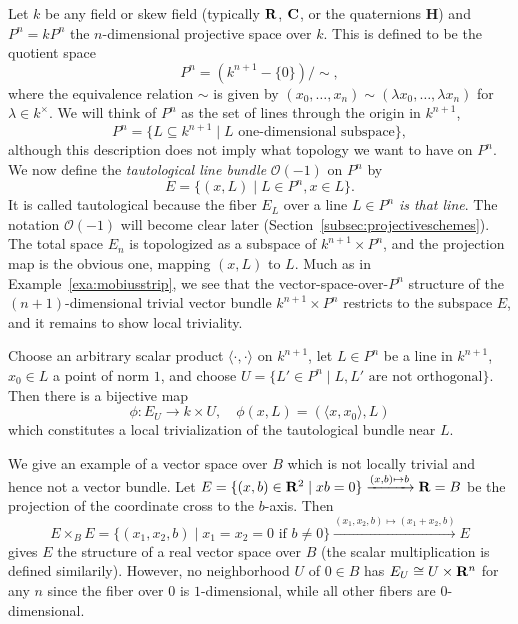 \documentclass[a4paper,openany]{scrbook}
\begin{document}
\begin{example} \label{exa:tautological-bundles}
Let $k$ be any field or skew field (typically $\mathbf R$, $\mathbf C$, or the quaternions $\mathbf H$) and $P^n = kP^n$ the $n$-dimensional projective space over $k$. This is defined to be the quotient space
\[
P^n = \left(k^{n+1}-\{0\}\right)/\sim,
\]
where the equivalence relation $\sim$ is given by $(x_0,\dots,x_n) \sim (\lambda x_0,\dots,\lambda x_n)$ for $\lambda \in k^\times$. We will think of $P^n$ as the set of lines through the origin in $k^{n+1}$,
\[
P^n = \{ L \subseteq k^{n+1} \mid L \text{ one-dimensional subspace}\},
\]
although this description does not imply what topology we want to have on $P^n$.
We now define the \emph{tautological line bundle} $\mathcal O(-1)$ on $P^n$ by
\[
E = \{ (x,L) \mid L \in P^n, x \in L\}.
\]
It is called tautological because the fiber $E_L$ over a line $L \in P^n$ \emph{is that line}. The notation $\mathcal O(-1)$ will become clear later (Section~\ref{subsec:projectiveschemes}). The total space $E_n$ is topologized as a subspace of $k^{n+1} \times P^n$, and the projection map is the obvious one, mapping $(x,L)$ to $L$. Much as in Example~\ref{exa:mobiusstrip}, we see that the vector-space-over-$P^n$ structure of the $(n+1)$-dimensional trivial vector bundle $k^{n+1} \times P^n$ restricts to the subspace $E$, and it remains to show local triviality.

Choose an arbitrary scalar product $\langle \cdot,\cdot \rangle$ on $k^{n+1}$, let $L \in P^n$ be a line in $k^{n+1}$, $x_0 \in L$ a point of norm $1$, and choose $U = \{ L' \in P^n \mid L,L' \text{ are not orthogonal}\}$. Then there is a bijective map
\[
\phi\colon E_U \to k \times U, \quad \phi(x,L) = (\langle x,x_0\rangle,L)
\]
which constitutes a local trivialization of the tautological bundle near $L$.
\end{example}

\begin{example} \label{exa:coordinatecross}
We give an example of a vector space over $B$ which is not locally trivial and hence not a vector bundle. Let $E=\{(x,b) \in \mathbf R^2 \mid xb=0\} \xrightarrow{(x,b) \mapsto b} \mathbf R = B$ be the projection of the coordinate cross to the $b$-axis. Then
\[
E \times_B E = \{(x_1,x_2,b) \mid x_1=x_2=0 \text{ if } b\neq 0\} \xrightarrow{(x_1,x_2,b) \mapsto (x_1+x_2,b)} E
\]
gives $E$ the structure of a real vector space over $B$ (the scalar multiplication is defined similarily). However, no neighborhood $U$ of $0 \in B$ has $E_U \cong U \times \mathbf R^n$ for any $n$ since the fiber over $0$ is $1$-dimensional, while all other fibers are $0$-dimensional.
\end{example}
\end{document}
